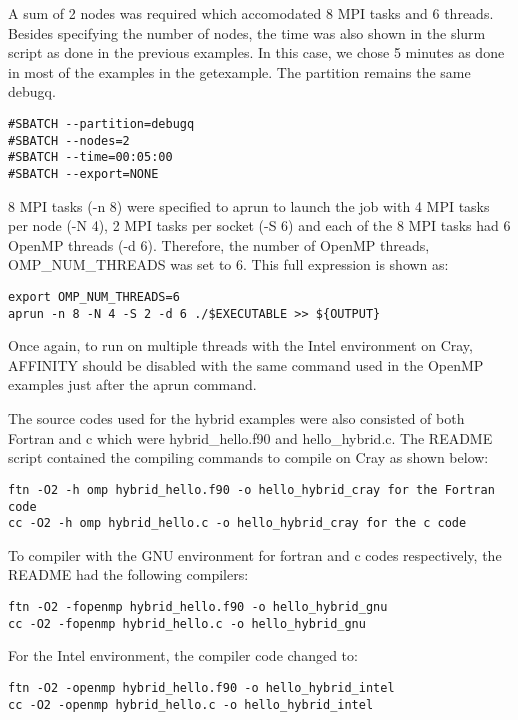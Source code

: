 \documentclass[journal]{IEEEtran}
\begin{document}
A sum of 2 nodes was required which accomodated 8 MPI tasks and 6 threads. Besides specifying the number of nodes, the time was also shown in the slurm 
script as done in the previous examples. In this case, we chose 5 minutes as done in most of the examples in the getexample.
The partition remains the same debugq.

\begin{verbatim}
#SBATCH --partition=debugq
#SBATCH --nodes=2
#SBATCH --time=00:05:00
#SBATCH --export=NONE
\end{verbatim}

8 MPI tasks (-n 8) were specified to aprun to launch the job with 4 MPI tasks per node (-N 4), 2 MPI tasks per socket (-S 6) and each of the 8 MPI tasks 
had 6 OpenMP threads (-d 6). Therefore, the number of OpenMP threads, {OMP_NUM_THREADS} was set to 6.
This full expression is shown as:

\begin{verbatim}
export OMP_NUM_THREADS=6
aprun -n 8 -N 4 -S 2 -d 6 ./$EXECUTABLE >> ${OUTPUT}
\end{verbatim}

Once again, to run on multiple threads with the Intel environment on Cray, AFFINITY should be disabled with the same command used in the OpenMP examples
just after the aprun command.

The source codes used for the hybrid examples were also consisted of both Fortran and c which were hybrid_hello.f90 and hello_hybrid.c. The README 
script contained the compiling commands to compile on Cray as shown below:

\begin{verbatim}
ftn -O2 -h omp hybrid_hello.f90 -o hello_hybrid_cray for the Fortran code
cc -O2 -h omp hybrid_hello.c -o hello_hybrid_cray for the c code
\end{verbatim}

To compiler with the GNU environment for fortran and c codes respectively, the README had the following compilers:

\begin{verbatim}
ftn -O2 -fopenmp hybrid_hello.f90 -o hello_hybrid_gnu
cc -O2 -fopenmp hybrid_hello.c -o hello_hybrid_gnu
\end{verbatim}

For the Intel environment, the compiler code changed to:
\begin{verbatim}
ftn -O2 -openmp hybrid_hello.f90 -o hello_hybrid_intel
cc -O2 -openmp hybrid_hello.c -o hello_hybrid_intel
\end{verbatim}
\end{document}
